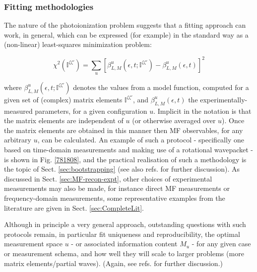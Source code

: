 \documentclass[10pt]{article}
\begin{document}
\subsubsection{Fitting methodologies\label{sec:fitting-intro}}

The nature of the photoionization problem suggests that a fitting approach can work, in general, which can be expressed (for example) in the standard way as a (non-linear) least-squares minimization problem:

\begin{equation}
\chi^{2}(\mathbb{I}^{\zeta\zeta'})=\sum_{u}\left[\beta^{u}_{L,M}(\epsilon,t;\mathbb{I}^{\zeta\zeta'})-\beta^{u}_{L,M}(\epsilon,t)\right]^{2}\label{eq:chi2-I}
\end{equation}

where $\beta^{u}_{L,M}(\epsilon,t;\mathbb{I}^{\zeta\zeta'})$ denotes  the values from a model function, computed for a given set of (complex) matrix elements $\mathbb{I}^{\zeta\zeta'}$, and $\beta^{u}_{L,M}(\epsilon,t)$ the experimentally-measured parameters, for a given configuration $u$. Implicit in the notation is that the matrix elements are independent of $u$ (or otherwise averaged over $u$). Once the matrix elements are obtained in this manner then MF observables, for any arbitrary $u$, can be calculated. An example of such a protocol - specifically one based on time-domain measurements and making use of a rotational wavepacket - is shown in Fig. \ref{781808}, %
and the practical realisation of such a methodology is the topic of Sect. \ref{sec:bootstrapping} (see also refs. \cite{hockett2018QMP2,marceau2017MolecularFrameReconstruction} for further discussion). As discussed in Sect. \ref{sec:MF-recon-expt}, other choices of experimental measurements may also be made, for instance direct MF measurements or frequency-domain measurements, some representative examples from the literature are given in Sect. \ref{sec:CompleteLit}. 

Although in principle a very general approach, outstanding questions with such protocols remain, in particular fit uniqueness and reproducibility, the optimal measurement space $u$ - or associated information content $M_u$ - for any given case or measurement schema, and how well they will scale to larger problems (more matrix elements/partial waves). (Again, see refs. \cite{hockett2018QMP2,marceau2017MolecularFrameReconstruction} for further discussion.)
\end{document}
